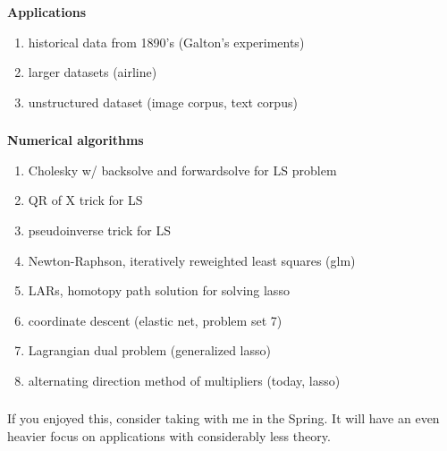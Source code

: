 \begin{frame}[fragile] \frametitle{}

\textbf{Applications}
\begin{enumerate}
\item historical data from 1890's (Galton's experiments)
\item larger datasets (airline)
\item unstructured dataset (image corpus, text corpus)
\end{enumerate}

\end{frame}

\begin{frame}[fragile] \frametitle{}

\textbf{Numerical algorithms}
\begin{enumerate}
\item Cholesky w/ backsolve and forwardsolve for LS problem
\item QR of X trick for LS
\item pseudoinverse trick for LS
\item Newton-Raphson, iteratively reweighted least squares (glm)
\item LARs, homotopy path solution for solving lasso
\item coordinate descent (elastic net, problem set 7)
\item Lagrangian dual problem (generalized lasso)
\item alternating direction method of multipliers (today, lasso)
\end{enumerate}

\end{frame}

\begin{frame}[fragile] \frametitle{}

If you enjoyed this, consider taking \textbf{}
with me in the Spring. It will have an even
heavier focus on applications with considerably less theory.

\end{frame}













